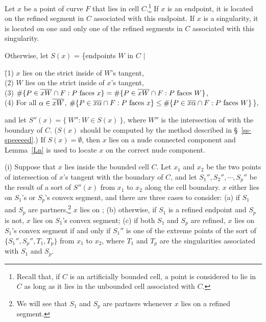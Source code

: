 \begin{theorem}
\label{Tps}
Let $x$ be a point of curve $F$ that lies in cell $C$.\footnote{Recall that, 
	if $C$ is an artificially bounded cell,
	a point is considered to lie in $C$ as long as it lies in the unbounded cell
	associated with $C$.}
If $x$ is an endpoint, it is located on the refined segment in $C$ associated
with this endpoint.
If $x$ is a singularity,
it is located on one and only one of the refined segments in $C$ associated with this 
singularity.

Otherwise, let $S(x)$ = \{endpoints $W$ in $C$ $\mid$
\begin{tabbing}
\indent \= {\rm (1)} $x$ lies on the strict inside of $W$'s tangent,\\
\> {\rm (2)} $W$ lies on the strict inside of $x$'s tangent,\\
\> {\rm (3)} \mbox{$\#\{P \in\mbox{$\overline{xW}$}\cap F: P \mbox{ faces $x$}\} =
\#\{P \in \mbox{$\overline{xW}$}\cap F: P \mbox{ faces $W$} \}$},\\
\> {\rm (4)} For all $\alpha \in \mbox{$\overline{xW}$}$,
$\#\{P \in\mbox{$\overline{x\alpha}$}\cap F: P \mbox{ faces $x$}\} \leq
\#\{P \in \mbox{$\overline{x\alpha}$}\cap F: P \mbox{ faces $W$}\}$\},
\end{tabbing}
%
\noindent and let $S''(x) = \{\ W'' : W \in S(x)\ \}$, where $W''$ is the intersection 
of  with the boundary of $C$.
{\rm (}$S(x)$ should be computed by the method described in \S~{\rm\ref{ss-speeeeed}.)}
If $S(x) = \emptyset$, then $x$ lies on a nude connected component and Lemma~{\rm\ref{Ln}}
is used to locate $x$ on the correct nude component.

{\rm (i)} Suppose that $x$ lies inside the bounded cell $C$.
Let $x_{1}$ and $x_{2}$ be the two points of intersection of $x$'s tangent with the
boundary of $C$, 
and let $S_{1}'',S_{2}'',\cdots,S_{p}''$ be the result of a sort of $S''(x)$ 
from $x_{1}$ to $x_{2}$ along the cell boundary.
$x$ either lies on $S_{1}$'s or $S_{p}$'s convex segment,
% 
%
and there are three cases to consider:
{\rm (a)} if $S_{1}$ and $S_{p}$ are partners,\footnote{We will see that $S_{1}$ and $S_{p}$ 
	are partners whenever $x$ lies on a refined segment.}
$x$ lies on ;
{\rm (b)} otherwise, if $S_{1}$ is a refined endpoint and 
$S_{p}$ is not, $x$ lies on $S_{1}$'s convex segment;
{\rm (c)} if both $S_{1}$ and $S_{p}$ are refined,
$x$ lies on $S_{1}$'s convex segment if and only if 
$S_{1}''$ is one of the extreme points of the sort
of $\{S_{1}'',S_{p}'',T_{1},T_{p}\}$ from $x_{1}$ to $x_{2}$, where
$T_{1}$ and $T_{p}$ are the singularities
associated with $S_{1}$ and $S_{p}$.


\end{theorem}
